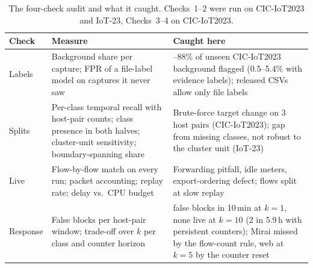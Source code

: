 \begin{table}[t]
\centering
\caption{The four-check audit and what it caught. Checks~1--2 were run on CIC-IoT2023 and IoT-23, Checks~3--4 on CIC-IoT2023.}
\label{tab:checklist}
\footnotesize
\setlength{\tabcolsep}{3pt}
\begin{tabular}{>{\raggedright\arraybackslash}p{1.1cm}>{\raggedright\arraybackslash}p{3.4cm}>{\raggedright\arraybackslash}p{3.5cm}}
\hline
Check & Measure & Caught here \\
\hline
1 Labels & Background share per capture; FPR of a file-label model on captures it never saw & 71--88\% of unseen CIC-IoT2023 background flagged (0.5--5.4\% with evidence labels); released CSVs allow only file labels \\
2 Splits & Per-class temporal recall with host-pair counts; class presence in both halves; cluster-unit sensitivity; boundary-spanning share & Brute-force target change on 3 host pairs (CIC-IoT2023); gap from missing classes, not robust to the cluster unit (IoT-23) \\
3 Live & Flow-by-flow match on every run; packet accounting; replay rate; delay vs.\ CPU budget & Forwarding pitfall, idle meters, export-ordering defect; flows split at slow replay \\
4 Response & False blocks per host-pair window; trade-off over $k$ per class and counter horizon & 60 false blocks in 10\,min at $k=1$, none live at $k=10$ (2 in 5.9\,h with persistent counters); Mirai missed by the flow-count rule, web at $k=5$ by the counter reset \\
\hline
\end{tabular}
\end{table}
